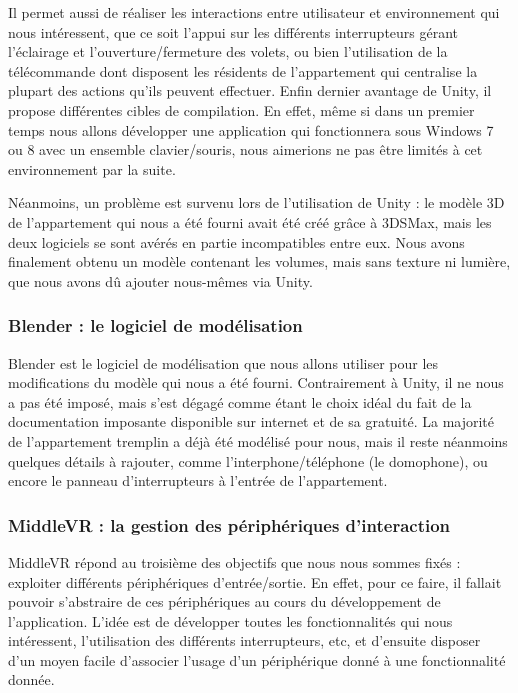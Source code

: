 Il permet aussi de réaliser les interactions entre utilisateur et environnement qui nous intéressent, que ce soit l'appui sur les différents interrupteurs gérant l'éclairage et l'ouverture/fermeture des volets, ou bien l'utilisation de la télécommande dont disposent les résidents de l'appartement qui centralise la plupart des actions qu'ils peuvent effectuer.
Enfin dernier avantage de Unity, il propose différentes cibles de compilation. En effet, même si dans un premier temps nous allons développer une application qui fonctionnera sous Windows 7 ou 8 avec un ensemble clavier/souris, nous aimerions ne pas être limités à cet environnement par la suite.

Néanmoins, un problème est survenu lors de l'utilisation de Unity : le modèle 3D de l'appartement qui nous a été fourni avait été créé grâce à 3DSMax, mais les deux logiciels se sont avérés en partie incompatibles entre eux. Nous avons finalement obtenu un modèle contenant les volumes, mais sans texture ni lumière, que nous avons dû ajouter nous-mêmes via Unity. 

\subsubsection{Blender : le logiciel de modélisation}
Blender est le logiciel de modélisation que nous allons utiliser pour les modifications du modèle qui nous a été fourni. Contrairement à Unity, il ne nous a pas été imposé, mais s'est dégagé comme étant le choix idéal du fait de la documentation imposante disponible sur internet et de sa gratuité.
La majorité de l'appartement tremplin a déjà été modélisé pour nous, mais il reste néanmoins quelques détails à rajouter, comme l'interphone/téléphone (le domophone), ou encore le panneau d'interrupteurs à l'entrée de l'appartement. 

\subsubsection{MiddleVR : la gestion des périphériques d'interaction}

MiddleVR répond au troisième des objectifs que nous nous sommes fixés : exploiter différents périphériques d'entrée/sortie. En effet, pour ce faire, il fallait pouvoir s'abstraire de ces périphériques au cours du développement de l'application. L'idée est de développer toutes les fonctionnalités qui nous intéressent, l'utilisation des différents interrupteurs, etc, et d'ensuite disposer d'un moyen facile d'associer l'usage d'un périphérique donné à une fonctionnalité donnée.

